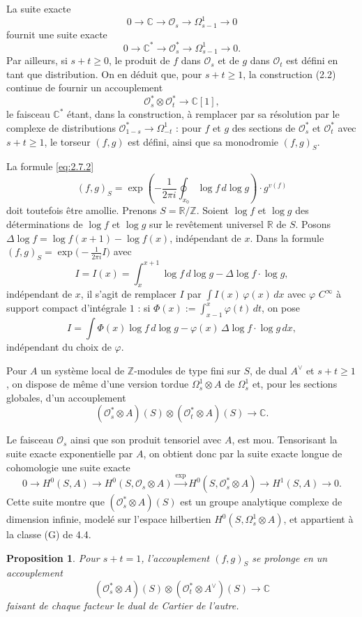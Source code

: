 \documentclass[12pt,a4paper]{article}
\theoremstyle{plain}
\newtheorem{proposition}[theorem]{Proposition}
\theoremstyle{definition}
\theoremstyle{remark}
\newcommand{\cO}{\mathcal{O}}
\newcommand{\Z}{\mathbb{Z}}
\newcommand{\C}{\mathbb{C}}
\newcommand{\R}{\mathbb{R}}
\providecommand{\cO}{\mathcal{O}}
\providecommand{\R}{\mathrm{R}}
\begin{document}
La suite exacte
\[
0 \to \C \to \cO_s \to \Omega^1_{s-1} \to 0
\]
fournit une suite exacte
\[
0 \to \C^* \to \cO_s^* \to \Omega^1_{s-1} \to 0.
\]
Par ailleurs, si $s + t \geq 0$, le produit de $f$ dans $\cO_s$ et de $g$ dans $\cO_t$ est défini en tant que
distribution. On en déduit que, pour $s + t \geq 1$, la construction (2.2) continue de fournir
un accouplement
\[
\cO_s^* \otimes \cO_t^* \to \C[1],
\]
le faisceau $\C^*$ étant, dans la construction, à remplacer par sa résolution par le complexe
de distributions $\cO^*_{1-s} \to \Omega^1_{-t}$ : pour $f$ et $g$ des sections de $\cO_s^*$ et $\cO_t^*$ avec $s + t \geq 1$, le
torseur $(f,g)$ est défini, ainsi que sa monodromie $(f,g)_S$.

La formule \eqref{eq:2.7.2}
\[
(f,g)_S = \exp\left(-\frac{1}{2\pi i} \oint_{x_0} \log f \, d\log g\right) \cdot g^{v(f)}
\]
doit toutefois être amollie. Prenons $S = \R/\Z$. Soient $\log f$ et $\log g$ des déterminations de
$\log f$ et $\log g$ sur le revêtement universel $\R$ de $S$. Posons $\Delta \log f = \log f(x+1) - \log f(x)$,
indépendant de $x$. Dans la formule $(f,g)_S = \exp\bigl(-\tfrac{1}{2\pi i} I\bigr)$ avec
\[
I = I(x) = \int_x^{x+1} \log f \, d\log g - \Delta \log f \cdot \log g,
\]
indépendant de $x$, il s'agit de remplacer $I$ par $\int I(x) \, \varphi(x) \, dx$ avec $\varphi$ $C^\infty$ à support compact
d'intégrale $1$ : si $\Phi(x) := \int_{x-1}^x \varphi(t) \, dt$, on pose
\[
I = \int \Phi(x) \log f \, d\log g - \varphi(x) \, \Delta \log f \cdot \log g \, dx,
\]
indépendant du choix de $\varphi$.

Pour $A$ un système local de $\Z$-modules de type fini sur $S$, de dual $A^\vee$ et $s + t \geq 1$,
on dispose de même d'une version tordue $\Omega^1_s \otimes A$ de $\Omega^1_s$ et, pour les sections globales,
d'un accouplement
\[
(\cO_s^* \otimes A)(S) \otimes (\cO_t^* \otimes A)(S) \to \C.
\]

Le faisceau $\cO_s$ ainsi que son produit tensoriel avec $A$, est mou. Tensorisant la suite
exacte exponentielle par $A$, on obtient donc par la suite exacte longue de cohomologie
une suite exacte
\[
0 \to H^0(S, A) \to H^0(S, \cO_s \otimes A) \xrightarrow{\exp} H^0(S, \cO_s^* \otimes A) \to H^1(S, A) \to 0.
\]
Cette suite montre que $(\cO_s^* \otimes A)(S)$ est un groupe analytique complexe de dimension
infinie, modelé sur l'espace hilbertien $H^0(S, \Omega_s^1 \otimes A)$, et appartient à la classe (G) de 4.4.

\begin{proposition}
Pour $s + t = 1$, l'accouplement $(f,g)_S$ se prolonge en un accouplement
\[
(\cO_s^* \otimes A)(S) \otimes (\cO_t^* \otimes A^\vee)(S) \to \C
\]
faisant de chaque facteur le dual de Cartier de l'autre.
\end{proposition}
\end{document}
